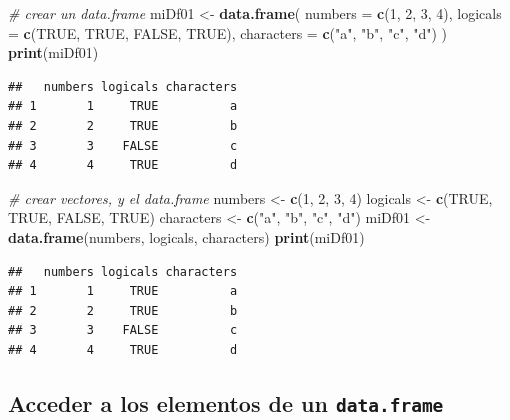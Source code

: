 \documentclass[]{book}
\newenvironment{Shaded}{\begin{snugshade}}{\end{snugshade}}
\newcommand{\KeywordTok}[1]{\textcolor[rgb]{0.13,0.29,0.53}{\textbf{#1}}}
\newcommand{\DataTypeTok}[1]{\textcolor[rgb]{0.13,0.29,0.53}{#1}}
\newcommand{\DecValTok}[1]{\textcolor[rgb]{0.00,0.00,0.81}{#1}}
\newcommand{\StringTok}[1]{\textcolor[rgb]{0.31,0.60,0.02}{#1}}
\newcommand{\CommentTok}[1]{\textcolor[rgb]{0.56,0.35,0.01}{\textit{#1}}}
\newcommand{\OtherTok}[1]{\textcolor[rgb]{0.56,0.35,0.01}{#1}}
\newcommand{\NormalTok}[1]{#1}
\begin{document}
\begin{Shaded}
\begin{Highlighting}[]
\CommentTok{# crear un data.frame }
\NormalTok{miDf01 <-}\StringTok{ }\KeywordTok{data.frame}\NormalTok{(}
  \DataTypeTok{numbers =} \KeywordTok{c}\NormalTok{(}\DecValTok{1}\NormalTok{, }\DecValTok{2}\NormalTok{, }\DecValTok{3}\NormalTok{, }\DecValTok{4}\NormalTok{), }
  \DataTypeTok{logicals =} \KeywordTok{c}\NormalTok{(}\OtherTok{TRUE}\NormalTok{, }\OtherTok{TRUE}\NormalTok{, }\OtherTok{FALSE}\NormalTok{, }\OtherTok{TRUE}\NormalTok{), }
  \DataTypeTok{characters =} \KeywordTok{c}\NormalTok{(}\StringTok{"a"}\NormalTok{, }\StringTok{"b"}\NormalTok{, }\StringTok{"c"}\NormalTok{, }\StringTok{"d"}\NormalTok{)}
\NormalTok{)}
\KeywordTok{print}\NormalTok{(miDf01)}
\end{Highlighting}
\end{Shaded}

\begin{verbatim}
##   numbers logicals characters
## 1       1     TRUE          a
## 2       2     TRUE          b
## 3       3    FALSE          c
## 4       4     TRUE          d
\end{verbatim}

\begin{Shaded}
\begin{Highlighting}[]
\CommentTok{# crear vectores, y el data.frame}
\NormalTok{numbers <-}\StringTok{ }\KeywordTok{c}\NormalTok{(}\DecValTok{1}\NormalTok{, }\DecValTok{2}\NormalTok{, }\DecValTok{3}\NormalTok{, }\DecValTok{4}\NormalTok{)}
\NormalTok{logicals <-}\StringTok{ }\KeywordTok{c}\NormalTok{(}\OtherTok{TRUE}\NormalTok{, }\OtherTok{TRUE}\NormalTok{, }\OtherTok{FALSE}\NormalTok{, }\OtherTok{TRUE}\NormalTok{)}
\NormalTok{characters <-}\StringTok{ }\KeywordTok{c}\NormalTok{(}\StringTok{"a"}\NormalTok{, }\StringTok{"b"}\NormalTok{, }\StringTok{"c"}\NormalTok{, }\StringTok{"d"}\NormalTok{)}
\NormalTok{miDf01 <-}\StringTok{ }\KeywordTok{data.frame}\NormalTok{(numbers, logicals, characters)}
\KeywordTok{print}\NormalTok{(miDf01)}
\end{Highlighting}
\end{Shaded}

\begin{verbatim}
##   numbers logicals characters
## 1       1     TRUE          a
## 2       2     TRUE          b
## 3       3    FALSE          c
## 4       4     TRUE          d
\end{verbatim}

\subsection{\texorpdfstring{Acceder a los elementos de un
\texttt{data.frame}}{Acceder a los elementos de un data.frame}}\label{acceder-a-los-elementos-de-un-data.frame}
\end{document}
